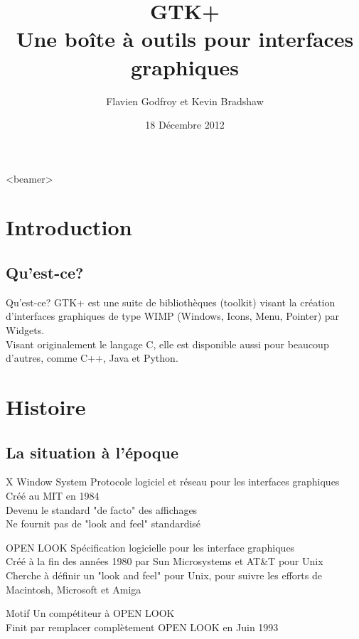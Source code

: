 \documentclass{beamer}
\title[GTK+]{GTK+\\Une boîte à outils pour interfaces graphiques}
\author{Flavien Godfroy et Kevin Bradshaw}
\date{18 Décembre 2012}
\begin{document}
  \begin{frame}
    \titlepage
  \end{frame}

  \begin{frame}<beamer>
      \frametitle{}
      \tableofcontents
    \end{frame}


  \section{Introduction}

  \subsection{Qu'est-ce?}
    \begin{frame}{Qu'est-ce?}
    GTK+ est une suite de bibliothèques (toolkit) visant la création d'interfaces graphiques de type WIMP (Windows, Icons, Menu, Pointer) par Widgets.\\
    Visant originalement le langage C, elle est disponible aussi pour beaucoup d'autres, comme C++, Java et Python.
  \end{frame}


  \section{Histoire}
  \subsection{La situation à l'époque}
  \begin{frame}{X Window System}
    Protocole logiciel et réseau pour les interfaces graphiques\\
    Créé au MIT en 1984\\
    Devenu le standard "de facto" des affichages\\
    Ne fournit pas de "look and feel" standardisé
  \end{frame}
  \begin{frame}{OPEN LOOK}
    Spécification logicielle pour les interface graphiques\\
    Créé à la fin des années 1980 par Sun Microsystems et AT\&T pour Unix\\
    Cherche à définir un "look and feel" pour Unix, pour suivre les efforts de Macintosh, Microsoft et Amiga
  \end{frame}
  \begin{frame}{Motif}
    Un compétiteur à OPEN LOOK\\
    Finit par remplacer complètement OPEN LOOK en Juin 1993
  \end{frame}
\end{document}
